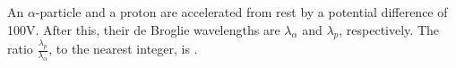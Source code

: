 
\item An $\alpha$-particle and a proton are accelerated from rest by a potential difference of 100V. After this, their de Broglie wavelengths are $\lambda_\alpha$ and $\lambda_p$, respectively. The ratio $\frac{\lambda_p}{\lambda_\alpha}$, to the nearest integer, is \underline{\hspace{2.5cm}}.
